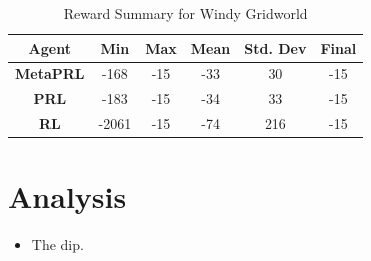 \begin{table}[h]
\centering
\begin{tabular}{|c|c|c|c|c|c|}
\hline
\textbf{Agent} & \textbf{Min} & \textbf{Max} & \textbf{Mean} & \textbf{Std. Dev} & \textbf{Final}\\ \hline
\textbf{MetaPRL} & -168 & -15 & -33 & 30 & -15\\ \hline
\textbf{PRL} & -183 & -15 & -34 & 33 & -15\\ \hline
\textbf{RL} & -2061 & -15 & -74 & 216 & -15 \\ \hline
\end{tabular}
\caption{Reward Summary for Windy Gridworld}
\label{tab:example_table}
\end{table}
\section{Analysis}
\begin{itemize}
    \item The dip.
    
\end{itemize}






